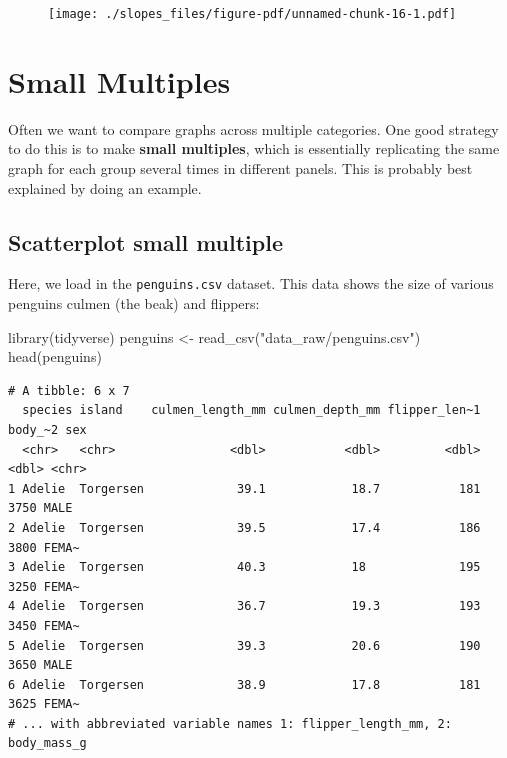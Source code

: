 \documentclass[
  letterpaper,
  DIV=11,
  numbers=noendperiod]{scrreprt}
\newenvironment{Shaded}{\begin{snugshade}}{\end{snugshade}}
\newcommand{\FunctionTok}[1]{\textcolor[rgb]{0.28,0.35,0.67}{#1}}
\newcommand{\NormalTok}[1]{\textcolor[rgb]{0.00,0.23,0.31}{#1}}
\newcommand{\OtherTok}[1]{\textcolor[rgb]{0.00,0.23,0.31}{#1}}
\newcommand{\StringTok}[1]{\textcolor[rgb]{0.13,0.47,0.30}{#1}}
\begin{document}
\begin{figure}[H]

{\centering \texttt{[image: ./slopes\_files/figure-pdf/unnamed-chunk-16-1.pdf]}

}

\end{figure}


\hypertarget{small-multiples}{%
\chapter{Small Multiples}\label{small-multiples}}

Often we want to compare graphs across multiple categories. One good
strategy to do this is to make \textbf{small multiples}, which is
essentially replicating the same graph for each group several times in
different panels. This is probably best explained by doing an example.

\hypertarget{scatterplot-small-multiple}{%
\section{\texorpdfstring{\textbf{Scatterplot small
multiple}}{Scatterplot small multiple}}\label{scatterplot-small-multiple}}

Here, we load in the \texttt{penguins.csv} dataset. This data shows the
size of various penguins culmen (the beak) and flippers:

\begin{Shaded}
\begin{Highlighting}[]
\FunctionTok{library}\NormalTok{(tidyverse)}
\NormalTok{penguins }\OtherTok{\textless{}{-}} \FunctionTok{read\_csv}\NormalTok{(}\StringTok{"data\_raw/penguins.csv"}\NormalTok{)}
\FunctionTok{head}\NormalTok{(penguins)}
\end{Highlighting}
\end{Shaded}

\begin{verbatim}
# A tibble: 6 x 7
  species island    culmen_length_mm culmen_depth_mm flipper_len~1 body_~2 sex  
  <chr>   <chr>                <dbl>           <dbl>         <dbl>   <dbl> <chr>
1 Adelie  Torgersen             39.1            18.7           181    3750 MALE 
2 Adelie  Torgersen             39.5            17.4           186    3800 FEMA~
3 Adelie  Torgersen             40.3            18             195    3250 FEMA~
4 Adelie  Torgersen             36.7            19.3           193    3450 FEMA~
5 Adelie  Torgersen             39.3            20.6           190    3650 MALE 
6 Adelie  Torgersen             38.9            17.8           181    3625 FEMA~
# ... with abbreviated variable names 1: flipper_length_mm, 2: body_mass_g
\end{verbatim}
\end{document}
